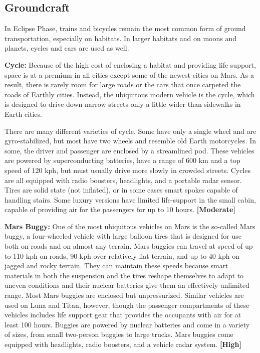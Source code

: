 \subsection{Groundcraft} \label{sec:groundcraft} 

In Eclipse Phase, trains and bicycles remain the most common form of ground transportation, especially on habitats. In larger habitats and on moons and planets, cycles and cars are used as well. 

\textbf{Cycle:} Because of the high cost of enclosing a habitat and providing life support, space is at a premium in all cities except some of the newest cities on Mars. As a result, there is rarely room for large roads or the cars that once carpeted the roads of Earthly cities. Instead, the ubiquitous modern vehicle is the cycle, which is designed to drive down narrow streets only a little wider than sidewalks in Earth cities. 

There are many different varieties of cycle. Some have only a single wheel and are gyro-stabilized, but most have two wheels and resemble old Earth motorcycles. In some, the driver and passenger are enclosed by a streamlined pod. These vehicles are powered by superconducting batteries, have a range of 600 km and a top speed of 120 kph, but must usually drive more slowly in crowded streets. Cycles are all equipped with radio boosters, headlights, and a portable radar sensor. Tires are solid state (not inflated), or in some cases smart spokes capable of handling stairs. Some luxury versions have limited life-support in the small cabin, capable of providing air for the passengers for up to 10 hours. \textbf{[Moderate]} 

\textbf{Mars Buggy:} One of the most ubiquitous vehicles on Mars is the so-called Mars buggy, a four-wheeled vehicle with large balloon tires that is designed for use both on roads and on almost any terrain. Mars buggies can travel at speed of up to 110 kph on roads, 90 kph over relatively flat terrain, and up to 40 kph on jagged and rocky terrain. They can maintain these speeds because smart materials in both the suspension and the tires reshape themselves to adapt to uneven conditions and their nuclear batteries give them an effectively unlimited range. Most Mars buggies are enclosed but unpressurized. Similar vehicles are used on Luna and Titan, however, though the passenger compartments of these vehicles includes life support gear that provides the occupants with air for at least 100 hours. Buggies are powered by nuclear batteries and come in a variety of sizes, from small two-person buggies to large trucks. Mars buggies come equipped with headlights, radio boosters, and a vehicle radar system. \textbf{[High]} 

